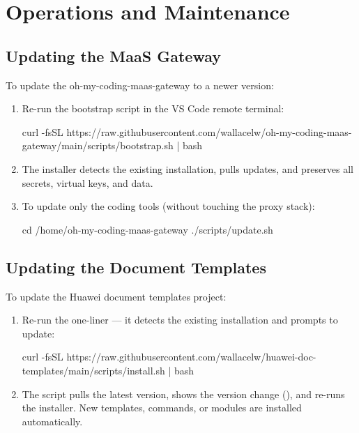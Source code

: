 \documentclass{guide}
\begin{document}
\section{Operations and Maintenance}
\begin{objectives}
\end{objectives}

\subsection{Updating the MaaS Gateway}

To update the oh-my-coding-maas-gateway to a newer version:

\stepbystep
\begin{enumerate}
  \item Re-run the bootstrap script in the VS Code remote terminal:
  \begin{code}[bash]
curl -fsSL https://raw.githubusercontent.com/wallacelw/oh-my-coding-maas-gateway/main/scripts/bootstrap.sh | bash
  \end{code}
  \item The installer detects the existing installation, pulls updates, and
        preserves all secrets, virtual keys, and data.
  \item To update only the coding tools (without touching the proxy stack):
  \begin{code}[bash]
cd /home/oh-my-coding-maas-gateway
./scripts/update.sh
  \end{code}
\end{enumerate}

\subsection{Updating the Document Templates}

To update the Huawei document templates project:

\stepbystep
\begin{enumerate}
  \item Re-run the one-liner --- it detects the existing installation and
        prompts to update:
  \begin{code}[bash]
curl -fsSL https://raw.githubusercontent.com/wallacelw/huawei-doc-templates/main/scripts/install.sh | bash
  \end{code}
  \item The script pulls the latest version, shows the version change
        (), and re-runs the installer. New
        templates, commands, or modules are installed automatically.
\end{enumerate}
\end{document}
